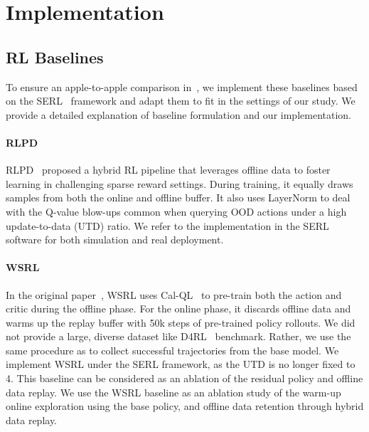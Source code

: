

\section{Implementation}

\subsection{RL Baselines}
\label{sec: RL baselines mod}
To ensure an apple-to-apple comparison in~, we implement these baselines based on the SERL~\cite{luo2024serl} framework and adapt them to fit in the settings of our study. We provide a detailed explanation of baseline formulation and our implementation.




\paragraph{RLPD}
RLPD~\citep{RLPD} proposed a hybrid RL pipeline that leverages offline data to foster learning in challenging sparse reward settings. During training, it equally draws samples from both the online and offline buffer. It also uses LayerNorm to deal with the Q-value blow-ups common when querying OOD actions under a high update-to-data (UTD) ratio. We refer to the implementation in the SERL software for both simulation and real deployment. 



\paragraph{WSRL} 
In the original paper~\citep{WSRL}, WSRL uses Cal-QL~\citep{cal-QL} to pre-train both the action and critic during the offline phase. For the online phase, it discards offline data and warms up the replay buffer with 50k steps of pre-trained policy rollouts.
We did not provide a large, diverse dataset like D4RL~\citep{fu2020d4rl} benchmark. Rather, we use the same procedure as \method to collect successful trajectories from the base model. We implement WSRL under the SERL framework, as the UTD is no longer fixed to 4. This baseline can be considered as an ablation of the residual policy and offline data replay. We use the WSRL baseline as an ablation study of the warm-up online exploration using the base policy, and offline data retention through hybrid data replay.

